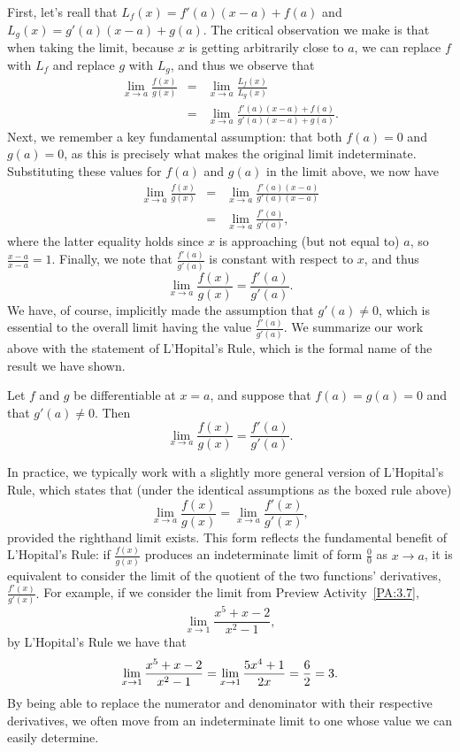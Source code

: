 First, let's reall that $L_f(x) = f'(a)(x-a) + f(a)$ and $L_g(x) = g'(a)(x-a) +g(a)$.  The critical observation we make is that when taking the limit, because $x$ is getting arbitrarily close to $a$, we can replace $f$ with $L_f$ and replace $g$ with $L_g$, and thus we observe that
\begin{eqnarray*}
\lim_{x \to a} \frac{f(x)}{g(x)} & = & \lim_{x \to a} \frac{L_f(x)}{L_g(x)} \\
& = & \lim_{x \to a} \frac{f'(a)(x-a) + f(a)}{g'(a)(x-a) + g(a)}.
\end{eqnarray*}
Next, we remember a key fundamental assumption: that both $f(a) = 0$ and $g(a) = 0$, as this is precisely what makes the original limit indeterminate.  Substituting these values for $f(a)$ and $g(a)$ in the limit above, we now have
\begin{eqnarray*}
\lim_{x \to a} \frac{f(x)}{g(x)} & = & \lim_{x \to a} \frac{f'(a)(x-a)}{g'(a)(x-a)} \\
& = & \lim_{x \to a} \frac{f'(a)}{g'(a)},
\end{eqnarray*}
where the latter equality holds since $x$ is approaching (but not equal to) $a$, so $\frac{x-a}{x-a} = 1$. 
Finally, we note that $\frac{f'(a)}{g'(a)}$ is constant with respect to $x$, and thus
$$\lim_{x \to a} \frac{f(x)}{g(x)} = \frac{f'(a)}{g'(a)}.$$
We have, of course, implicitly made the assumption that $g'(a) \ne 0$, which is essential to the overall limit having the value $\frac{f'(a)}{g'(a)}$.  We summarize our work above with the statement of L'Hopital's Rule, which is the formal name of the result we have shown.

{Let $f$ and $g$ be differentiable at $x=a$, and suppose that
\mbox{$f(a) = g(a) = 0$} and that $g'(a) \neq 0$.  Then
$$ \lim_{x \to a} \frac{f(x)}{g(x)} = \frac{f'(a)}{g'(a)}.$$ 
} %

In practice, we typically work with a slightly more general version of L'Hopital's Rule, which states that (under the identical assumptions as the boxed rule above) 
$$\lim_{x \to a} \frac{f(x)}{g(x)} = \lim_{x \to a} \frac{f'(x)}{g'(x)},$$
provided the righthand limit exists.  This form reflects the fundamental benefit of L'Hopital's Rule:  if $\frac{f(x)}{g(x)}$ produces an indeterminate limit of form $\frac{0}{0}$ as $x \to a$, it is equivalent to consider the limit of the quotient of the two functions' derivatives, $\frac{f'(x)}{g'(x)}.$  For example, if we consider the limit from Preview Activity~\ref{PA:3.7},
$$\lim_{x \to 1} \frac{x^5 + x - 2}{x^2 - 1},$$
by L'Hopital's Rule we have that
$$
\lim_{x \to 1} \frac{x^5 + x - 2}{x^2 - 1} = \lim_{x \to 1} \frac{5x^4 + 1}{2x} = \frac{6}{2} = 3. \\
$$
By being able to replace the numerator and denominator with their respective derivatives, we often move from an indeterminate limit to one whose value we can easily determine.  

